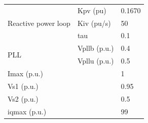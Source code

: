 \documentclass{report}
\begin{document}
\begin{table}[H]
\begin{tabular}{ll|l}
\multicolumn{1}{l|}{\multirow{3}{*}{Reactive power loop}} & Kpv (pu)       & 0.1670   \\ \cline{2-3} 
\multicolumn{1}{l|}{}                                     & Kiv (pu/s)       & 50       \\\cline{2-3} 
\multicolumn{1}{l|}{}                                     & tau        & 0.1      \\ \hline
\multicolumn{1}{l|}{\multirow{2}{*}{PLL}}                 & Vpllb  (p.u.)    & 0.4      \\ \cline{2-3} 
\multicolumn{1}{l|}{}                                     & Vpllu  (p.u.)    & 0.5      \\ \hline
\multicolumn{2}{l|}{Imax (p.u.)}                                              & 1        \\ \hline
\multicolumn{2}{l|}{Vs1 (p.u.)}                                               & 0.95     \\ \hline
\multicolumn{2}{l|}{Vs2 (p.u.)}                                               & 0.5      \\ \hline
\multicolumn{2}{l|}{iqmax (p.u.)}                                             & 99      
\end{tabular}
\label{table_1VSC_model_parameters}
\end{table}
\end{document}
